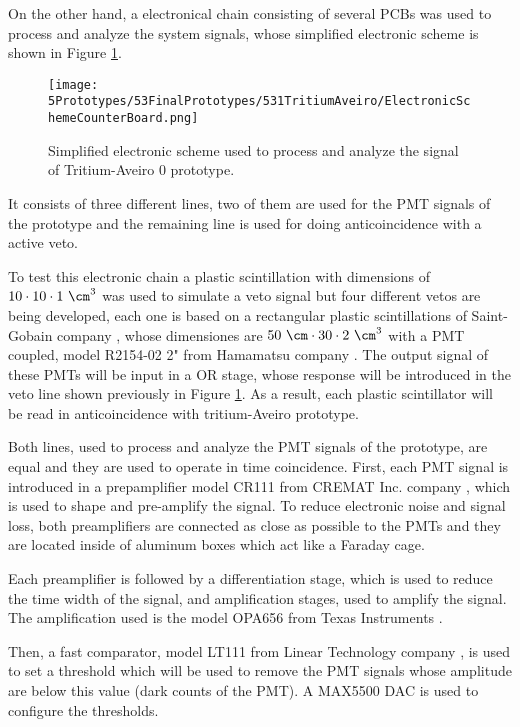 On the other hand, a electronical chain consisting of several PCBs was used to process and analyze the system signals, whose simplified electronic scheme is shown in Figure \ref{fig:ElectronicSchemCounterBoard}.

\begin{figure}[h]
\centering
\texttt{[image: 5Prototypes/53FinalPrototypes/531TritiumAveiro/ElectronicSchemeCounterBoard.png]}
\caption{Simplified electronic scheme used to process and analyze the signal of Tritium-Aveiro 0 prototype. \label{fig:ElectronicSchemCounterBoard}}
\end{figure}

It consists of three different lines, two of them are used for the PMT signals of the prototype and the remaining line is used for doing anticoincidence with a active veto.

To test this electronic chain a plastic scintillation with dimensions of $10 \cdot{} 10 \cdot{} 1~\cm^3$ was used to simulate a veto signal but four different vetos are being developed, each one is based on a rectangular plastic scintillations of Saint-Gobain company \cite{VetoAveiro}, whose dimensiones are $50~\cm \cdot{} 30 \cdot{} 2~\cm^3$  with a PMT coupled, model R2154-02 2" from Hamamatsu company \cite{DataSheetPMTsAveiro}. The output signal of these PMTs will be input in a OR stage, whose response will be introduced in the veto line shown previously in Figure \ref{fig:ElectronicSchemCounterBoard}. As a result, each plastic scintillator will be read in anticoincidence with tritium-Aveiro prototype.

Both lines, used to process and analyze the PMT signals of the prototype, are equal and they are used to operate in time coincidence. First, each PMT signal is introduced in a prepamplifier model CR111 from CREMAT Inc. company \cite{CREMATPreAmplifierDataSheet}, which is used to shape and pre-amplify the signal. To reduce electronic noise and signal loss, both preamplifiers are connected as close as possible to the PMTs and they are located inside of aluminum boxes which act like a Faraday cage.

Each preamplifier is followed by a differentiation stage, which is used to reduce the time width of the signal, and amplification stages, used to amplify the signal. The amplification used is the model OPA656 from Texas Instruments \cite{OPA656}. 

Then, a fast comparator, model LT111 from Linear Technology company \cite{LT111}, is used to set a threshold which will be used to remove the PMT signals whose amplitude are below this value (dark counts of the PMT). A MAX5500 DAC is used to configure the thresholds.

